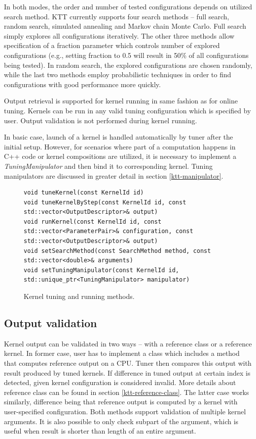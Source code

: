 \documentclass
[
    digital, %
    oneside, %
    table, %
    nolof, %
    nolot, %
    nocover %
]{fithesis3}
\begin{document}
In both modes, the order and number of tested configurations depends on utilized search method. KTT currently supports four search methods -- full
search, random search, simulated annealing and Markov chain Monte Carlo. Full search simply explores all configurations iteratively. The other three
methods allow specification of a fraction parameter which controls number of explored configurations (e.g., setting fraction to 0.5 will result in
50\% of all configurations being tested). In random search, the explored configurations are chosen randomly, while the last two methods employ
probabilistic techniques in order to find configurations with good performance more quickly.

Output retrieval is supported for kernel running in same fashion as for online tuning. Kernels can be run in any valid tuning configuration which is
specified by user. Output validation is not performed during kernel running.

In basic case, launch of a kernel is handled automatically by tuner after the initial setup. However, for scenarios where part of a computation
happens in C++ code or kernel compositions are utilized, it is necessary to implement a \textit{TuningManipulator} and then bind it to corresponding
kernel. Tuning manipulators are discussed in greater detail in section \ref{ktt-manipulator}.

\begin{figure}
\begin{adjustwidth}{-1cm}{-1cm}
\begin{lstlisting}
void tuneKernel(const KernelId id)
void tuneKernelByStep(const KernelId id, const std::vector<OutputDescriptor>& output)
void runKernel(const KernelId id, const std::vector<ParameterPair>& configuration, const std::vector<OutputDescriptor>& output)
void setSearchMethod(const SearchMethod method, const std::vector<double>& arguments)
void setTuningManipulator(const KernelId id, std::unique_ptr<TuningManipulator> manipulator)
\end{lstlisting}
\caption{Kernel tuning and running methods.}
\label{ktt-tuning-methods}
\end{adjustwidth}
\end{figure}

\subsection{Output validation}
Kernel output can be validated in two ways -- with a reference class or a reference kernel. In former case, user has to implement a class which
includes a method that computes reference output on a CPU. Tuner then compares this output with result produced by tuned kernels. If difference in tuned
output at certain index is detected, given kernel configuration is considered invalid. More details about reference class can be found in section
\ref{ktt-reference-class}. The latter case works similarly, difference being that reference output is computed by a kernel with user-specified
configuration. Both methods support validation of multiple kernel arguments. It is also possible to only check subpart of the argument, which is useful
when result is shorter than length of an entire argument.
\end{document}
